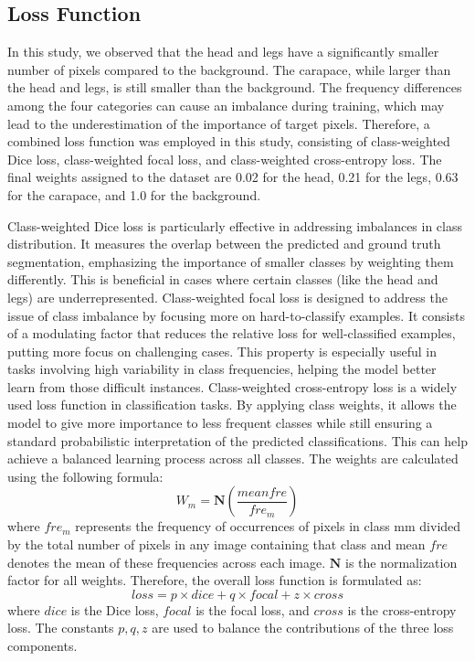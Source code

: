 \documentclass[conference]{IEEEtran}
\begin{document}
\subsection{Loss Function}
In this study, we observed that the head and legs have a significantly smaller number of pixels compared to the background. The carapace, while larger than the head and legs, is still smaller than the background. The frequency differences among the four categories can cause an imbalance during training, which may lead to the underestimation of the importance of target pixels. Therefore, a combined loss function was employed in this study, consisting of class-weighted Dice loss, class-weighted focal loss, and class-weighted cross-entropy loss. The final weights assigned to the dataset are 0.02 for the head, 0.21 for the legs, 0.63 for the carapace, and 1.0 for the background.

Class-weighted Dice loss is particularly effective in addressing imbalances in class distribution. It measures the overlap between the predicted and ground truth segmentation, emphasizing the importance of smaller classes by weighting them differently. This is beneficial in cases where certain classes (like the head and legs) are underrepresented.
Class-weighted focal loss is designed to address the issue of class imbalance by focusing more on hard-to-classify examples. It consists of a modulating factor that reduces the relative loss for well-classified examples, putting more focus on challenging cases. This property is especially useful in tasks involving high variability in class frequencies, helping the model better learn from those difficult instances.
Class-weighted cross-entropy loss is a widely used loss function in classification tasks. By applying class weights, it allows the model to give more importance to less frequent classes while still ensuring a standard probabilistic interpretation of the predicted classifications. This can help achieve a balanced learning process across all classes.
The weights are calculated using the following formula:
$$
W_m=\mathbf{N}(\frac{mean fre}{fre_m })
$$
where $fre_m$ represents the frequency of occurrences of pixels in class mm divided by the total number of pixels in any image containing that class and mean $fre$  denotes the mean of these frequencies across each image. $\mathbf{N}$ is the normalization factor for all weights. Therefore, the overall loss function is formulated as:
$$
loss=p\times dice+q\times focal+z\times cross
$$
where $dice$ is the Dice loss, $focal$ is the focal loss, and $cross$ is the cross-entropy loss. The constants $p,q,z$ are used to balance the contributions of the three loss components.
\end{document}
